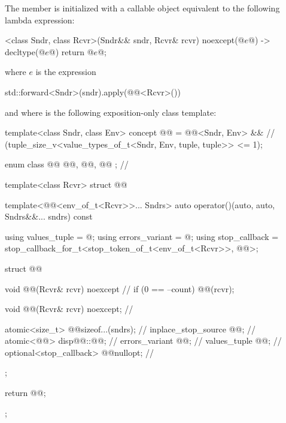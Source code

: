 \pnum
The member 
is initialized with a callable object
equivalent to the following lambda expression:
\begin{codeblock}
[]<class Sndr, class Rcvr>(Sndr&& sndr, Rcvr& rcvr) noexcept(@$e$@) -> decltype(@$e$@) {
  return @$e$@;
}
\end{codeblock}
where $e$ is the expression
\begin{codeblock}
std::forward<Sndr>(sndr).apply(@@<Rcvr>())
\end{codeblock}
and where  is the following exposition-only class template:
\begin{codeblock}
template<class Sndr, class Env>
concept @@ = @@<Sndr, Env> &&                // \expos
  (tuple_size_v<value_types_of_t<Sndr, Env, tuple, tuple>> <= 1);

enum class @@ { @@, @@, @@ };             // \expos

template<class Rcvr>
struct @@ {
  template<@@<env_of_t<Rcvr>>... Sndrs>
  auto operator()(auto, auto, Sndrs&&... sndrs) const {
    using values_tuple = @\seebelow@;
    using errors_variant = @\seebelow@;
    using stop_callback = stop_callback_for_t<stop_token_of_t<env_of_t<Rcvr>>, @@>;

    struct @@ {
      void @@(Rcvr& rcvr) noexcept {                        // \expos
        if (0 == --count) {
          @@(rcvr);
        }
      }

      void @@(Rcvr& rcvr) noexcept;                       // \expos

      atomic<size_t> @@{sizeof...(sndrs)};                   // \expos
      inplace_stop_source @@{};                           // \expos
      atomic<@@> disp{@@::@@};           // \expos
      errors_variant @@{};                                  // \expos
      values_tuple @@{};                                    // \expos
      optional<stop_callback> @@{nullopt};                 // \expos
    };

    return @@{};
  }
};
\end{codeblock}

